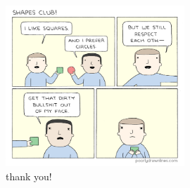 \documentclass[include/preamble.tex]{subfiles}
\begin{document}

\begin{frame}
  \begin{figure}
    \begin{center}
      \includegraphics[width=0.6\textwidth]{images/shapes-club.png}
    \end{center}
    \caption{thank you!}
  \end{figure}
\end{frame}
\end{document}

